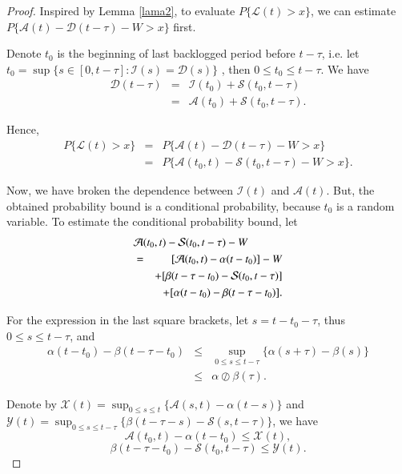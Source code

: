 \documentclass[paper]{ieice}
\newtheorem{proof}{Proof}
\begin{document}
\begin{proof}
Inspired by Lemma \ref{lama2}, to evaluate $P\{\mathcal{L}(t)>x\}$, we can estimate $P\{\mathcal{A}(t)-\mathcal{D}(t-\tau)-W>x\}$ first.

Denote $t_{0}$ is the beginning of last backlogged period before $t-\tau$, i.e. let $t_0=\sup\{s\in[0,t-\tau]:\mathcal{I}(s)=\mathcal{D}(s)\}$ \cite{Fidl06}, then $0\leq t_{0}\leq t-\tau$. We have
\begin{eqnarray*}
  \mathcal{D}(t-\tau)&=&\mathcal{I}(t_{0})+\mathcal{S}(t_{0},t-\tau)\\
  &=& \mathcal{A}(t_{0})+\mathcal{S}(t_{0},t-\tau).
\end{eqnarray*}

Hence,
\begin{eqnarray*}
P\{\mathcal{L}(t)>x\}&=&P\{\mathcal{A}(t)-\mathcal{D}(t-\tau)-W>x\}\\
&=&P\{\mathcal{A}(t_0,t)-\mathcal{S}(t_0,t-\tau)-W>x\}.
\end{eqnarray*}

Now, we have broken the dependence between $\mathcal{I}(t)$ and $\mathcal{A}(t)$. But, the obtained probability bound is a conditional probability, because $t_{0}$ is a random variable. To estimate the conditional probability bound, let
\begin{eqnarray}\label{condprob}
\lefteqn{\mathcal{A}(t_0,t)-\mathcal{S}(t_0,t-\tau)-W}\nonumber\\
&=&[\mathcal{A}(t_{0},t)-\alpha(t-t_{0})]-W\nonumber\\
&&+[\beta(t-\tau-t_{0})-\mathcal{S}(t_{0},t-\tau)]\nonumber\\
&&+[\alpha(t-t_{0})-\beta(t-\tau-t_{0})].
\end{eqnarray}

For the expression in the last square brackets, let $s=t-t_{0}-\tau$, thus $0\leq s\leq t-\tau$, and
\begin{eqnarray}\label{curve}
  \alpha(t-t_{0})-\beta(t-\tau-t_{0})&\leq &\sup_{0\leq s\leq t-\tau}\{\alpha(s+\tau)-\beta(s)\}\nonumber\\
  &\leq & \alpha\oslash\beta(\tau).
\end{eqnarray}

Denote by $\mathcal{X}(t)=\sup_{0\leq s\leq t}\{\mathcal{A}(s,t)-\alpha(t-s)\}$ and $\mathcal{Y}(t)=\sup_{0\leq s\leq t-\tau}\{\beta(t-\tau-s)-\mathcal{S}(s,t-\tau)\}$, we have
\begin{equation}\label{vbc}
\mathcal{A}(t_{0},t)-\alpha(t-t_{0})\leq \mathcal{X}(t),
\end{equation}
\begin{equation}\label{vb}
\beta(t-\tau-t_{0})-\mathcal{S}(t_{0},t-\tau)\leq \mathcal{Y}(t).
\end{equation}


\end{proof}
\end{document}
